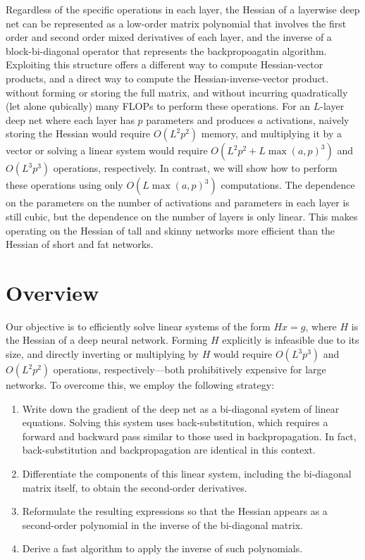 \documentclass{article}
\begin{document}
Regardless of the specific operations in each layer, the Hessian of a layerwise
deep net can be represented as a low-order matrix polynomial that involves the
first order and second order mixed derivatives of each layer, and the inverse
of a block-bi-diagonal operator that represents the backpropoagatin algorithm.
Exploiting this structure offers a different way to compute Hessian-vector
products, and a direct way to compute the Hessian-inverse-vector product.
without forming or storing the full matrix, and without incurring quadratically
(let alone qubically) many FLOPs to perform these operations. For an $L$-layer
deep net where each layer has $p$ parameters and produces $a$ activations,
naively storing the Hessian would require $O(L^2p^2)$ memory, and multiplying
it by a vector or solving a linear system would require $O(L^2p^2 +
    L\max(a,p)^3)$ and $O(L^3p^3)$ operations, respectively. In contrast, we will
show how to perform these operations using only $O(L \max(a, p)^3)$
computations. The dependence on the parameters on the number of activations and
parameters in each layer is still cubic, but the dependence on the number of
layers is only linear. This makes operating on the Hessian of tall and skinny
networks more efficient than the Hessian of short and fat networks.

\section{Overview}

Our objective is to efficiently solve linear systems of the form $H x = g$,
where $H$ is the Hessian of a deep neural network. Forming $H$ explicitly is
infeasible due to its size, and directly inverting or multiplying by $H$ would
require $O(L^3p^3)$ and $O(L^2p^2)$ operations, respectively---both
prohibitively expensive for large networks. To overcome this, we employ the
following strategy:
\begin{enumerate}
    \item
          Write down the gradient of the deep net as a bi-diagonal system of linear
          equations. Solving this system uses back-substitution, which requires a forward
          and backward pass similar to those used in backpropagation. In fact,
          back-substitution and backpropagation are identical in this context.
    \item
          Differentiate the components of this linear system, including the bi-diagonal
          matrix itself, to obtain the second-order derivatives.
    \item
          Reformulate the resulting expressions so that the Hessian appears as a
          second-order polynomial in the inverse of the bi-diagonal matrix.
    \item
          Derive a fast algorithm to apply the inverse of such polynomials.
\end{enumerate}
\end{document}
